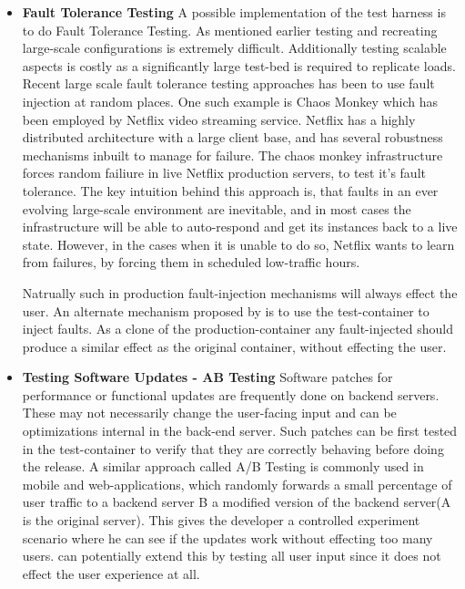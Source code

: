 \begin{itemize}
  \item \textbf{Fault Tolerance Testing}
    A possible implementation of the \parikshan test harness is to do Fault Tolerance Testing.
As mentioned earlier testing and recreating large-scale configurations is extremely difficult.
Additionally testing scalable aspects is costly as a significantly large test-bed is required to replicate loads. 
Recent large scale fault tolerance testing approaches has been to use fault injection at random places.
One such example is Chaos Monkey\cite{chaosmonkey} which has been employed by Netflix \cite{netflix} video streaming service. 
Netflix has a highly distributed architecture with a large client base, and has several robustness mechanisms inbuilt to manage for failure. 
The chaos monkey infrastructure forces random failiure in live Netflix production servers, to test it's fault tolerance.
The key intuition behind this approach is, that faults in an ever evolving large-scale environment are inevitable, and in most cases the infrastructure will be able to auto-respond and get its instances back to a live state. 
However, in the cases when it is unable to do so, Netflix wants to learn from failures, by forcing them in scheduled low-traffic hours.

Natrually such in production fault-injection mechanisms will always effect the user. 
An alternate mechanism proposed by \parikshan is to use the test-container to inject faults. 
As a clone of the production-container any fault-injected should produce a similar effect as the original container, without effecting the user.

  \item \textbf{Testing Software Updates - AB Testing}
Software patches for performance or functional updates are frequently done on backend servers. 
These may not necessarily change the user-facing input and can be optimizations internal in the back-end server.
Such patches can be first tested in the test-container to verify that they are correctly behaving before doing the release.
A similar approach called A/B Testing\cite{abtesting} is commonly used in mobile and web-applications, which randomly forwards a small percentage of user traffic to a backend server B  a modified version of the backend server(A is the original server). 
This gives the developer a controlled experiment scenario where he can see if the updates work without effecting too many users.
\parikshan can potentially extend this by testing all user input since it does not effect the user experience at all.


\end{itemize}
